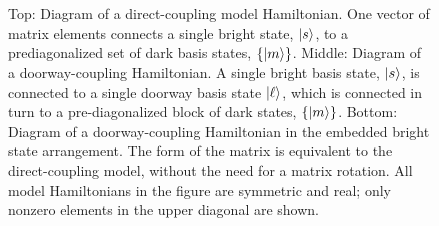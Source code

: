 \begin{figure}
  \caption{Top: Diagram of a direct-coupling model Hamiltonian.  One
    vector of matrix elements connects a single bright state, $\mathinner{|{s}\rangle}$,
    to a prediagonalized set of dark basis states, $\lbrace \mathinner{|{m}\rangle}
    \rbrace$.  Middle: Diagram of a doorway-coupling Hamiltonian.  A
    single bright basis state, $\mathinner{|{s}\rangle}$, is connected to a single
    doorway basis state $\mathinner{|{\ell}\rangle}$, which is connected in turn to a
    pre-diagonalized block of dark states, $\lbrace \mathinner{|{m}\rangle} \rbrace$.
    Bottom: Diagram of a doorway-coupling Hamiltonian in the embedded
    bright state arrangement. The form of the matrix is equivalent to
    the direct-coupling model, without the need for a matrix
    rotation.  All model Hamiltonians in the figure are symmetric and
    real; only nonzero elements in the upper diagonal are shown.}
  \label{fig:matrix}
  \centering
  \\[1cm]
  \\[1cm]
\end{figure}

